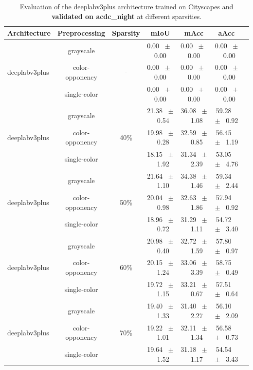 \begin{table}[h]
  \centering
  \caption{Evaluation of the deeplabv3plus architecture trained on Cityscapes and \textbf{validated on acdc_night} at different sparsities.}
  \begin{tabular}{@{}lccc ccc@{}}
    \toprule
    Architecture & Preprocessing & Sparsity & mIoU & mAcc & aAcc \\
    \midrule
    \midrule
    \midrule
    \multirow{3}{*}{deeplabv3plus} & grayscale & \multirow{3}{*}{-} & 0.00 ~$\pm$~ 0.00 & 0.00 ~$\pm$~ 0.00 & 0.00 ~$\pm$~ 0.00 \\
    & color-opponency & & 0.00 ~$\pm$~ 0.00 & 0.00 ~$\pm$~ 0.00 & 0.00 ~$\pm$~ 0.00 \\
    & single-color & & 0.00 ~$\pm$~ 0.00 & 0.00 ~$\pm$~ 0.00 & 0.00 ~$\pm$~ 0.00 \\
    \midrule
    \multirow{3}{*}{deeplabv3plus} & grayscale & \multirow{3}{*}{40\%} & 21.38 ~$\pm$~ 0.54 & 36.08 ~$\pm$~ 1.08 & 59.28 ~$\pm$~ 0.92 \\
    & color-opponency & & 19.98 ~$\pm$~ 0.28 & 32.59 ~$\pm$~ 0.85 & 56.45 ~$\pm$~ 1.19 \\
    & single-color & & 18.15 ~$\pm$~ 1.92 & 31.34 ~$\pm$~ 2.39 & 53.05 ~$\pm$~ 4.76 \\
    \midrule
    \multirow{3}{*}{deeplabv3plus} & grayscale & \multirow{3}{*}{50\%} & 21.64 ~$\pm$~ 1.10 & 34.38 ~$\pm$~ 1.46 & 59.34 ~$\pm$~ 2.44 \\
    & color-opponency & & 20.04 ~$\pm$~ 0.98 & 32.63 ~$\pm$~ 1.86 & 57.94 ~$\pm$~ 0.92 \\
    & single-color & & 18.96 ~$\pm$~ 0.72 & 31.29 ~$\pm$~ 1.11 & 54.72 ~$\pm$~ 3.40 \\
    \midrule
    \multirow{3}{*}{deeplabv3plus} & grayscale & \multirow{3}{*}{60\%} & 20.98 ~$\pm$~ 0.40 & 32.72 ~$\pm$~ 1.59 & 57.80 ~$\pm$~ 0.97 \\
    & color-opponency & & 20.15 ~$\pm$~ 1.24 & 33.06 ~$\pm$~ 3.39 & 58.75 ~$\pm$~ 0.49 \\
    & single-color & & 19.72 ~$\pm$~ 1.15 & 33.21 ~$\pm$~ 0.67 & 57.51 ~$\pm$~ 0.64 \\
    \midrule
    \multirow{3}{*}{deeplabv3plus} & grayscale & \multirow{3}{*}{70\%} & 19.40 ~$\pm$~ 1.33 & 31.40 ~$\pm$~ 2.27 & 56.10 ~$\pm$~ 2.09 \\
    & color-opponency & & 19.22 ~$\pm$~ 1.01 & 32.11 ~$\pm$~ 1.34 & 56.58 ~$\pm$~ 0.73 \\
    & single-color & & 19.64 ~$\pm$~ 1.52 & 31.18 ~$\pm$~ 1.17 & 54.54 ~$\pm$~ 3.43 \\

\end{tabular}
\end{table}
